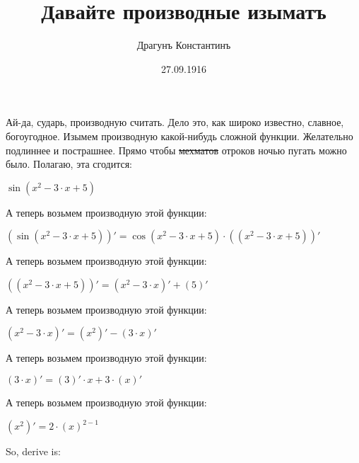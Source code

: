 \documentclass[12pt,a4paper]{article}
\author{Драгунъ Константинъ}
\title{Давайте производные изыматъ}
\date{27.09.1916}
\begin{document}
\maketitle

Ай-да, сударь, производную считать. Дело это, как широко известно, славное, богоугодное. Изымем производную какой-нибудь сложной функции.
Желательно подлиннее и пострашнее. Прямо чтобы \sout{мехматов} отроков ночью пугать можно было. 
Полагаю, эта сгодится:

\begin{center}
\begin{math}
\sin{\left({x}^{2}-3 \cdot x+5 \right )}
\end{math}
\end{center}
А теперь возьмем производную этой функции:

\begin{center}
\begin{math}
 \left ( \sin{\left({x}^{2}-3 \cdot x+5 \right )} \right)'=\cos{\left({x}^{2}-3 \cdot x+5 \right )}\cdot \left(\left({x}^{2}-3 \cdot x+5 \right ) \right)'
\end{math}
\end{center}
А теперь возьмем производную этой функции:

\begin{center}
\begin{math}
 \left ( \left({x}^{2}-3 \cdot x+5 \right ) \right)'= \left ( {x}^{2}-3 \cdot x \right)'+ \left ( 5 \right)'
\end{math}
\end{center}
А теперь возьмем производную этой функции:

\begin{center}
\begin{math}
 \left ( {x}^{2}-3 \cdot x \right)'= \left ( {x}^{2} \right)'- \left ( 3 \cdot x \right)'
\end{math}
\end{center}
А теперь возьмем производную этой функции:

\begin{center}
\begin{math}
 \left ( 3 \cdot x \right)'= \left ( 3 \right)' \cdot x+3\cdot \left ( x \right)'
\end{math}
\end{center}
А теперь возьмем производную этой функции:

\begin{center}
\begin{math}
 \left ( {x}^{2} \right)'=2 \cdot \left(x \right)^{2- 1}
\end{math}
\end{center}
So, derive is:
\end{document}
